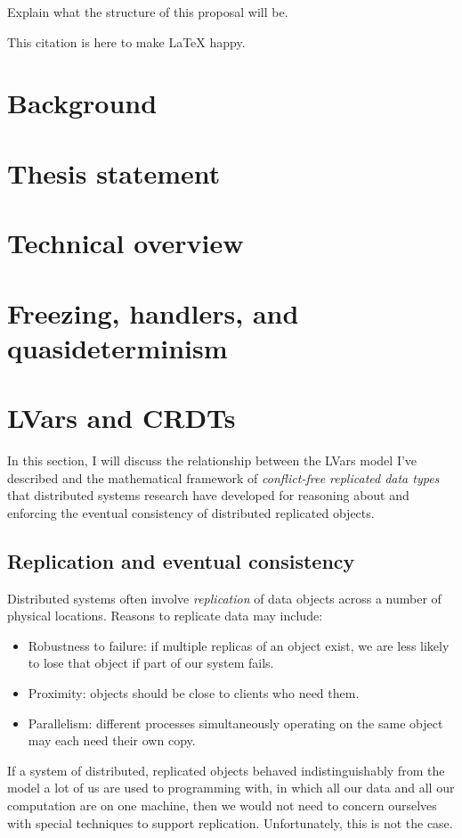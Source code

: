 \documentclass{article}
\begin{document}
Explain what the structure of this proposal will be.

This citation \cite{LVars-TR} is here to make LaTeX happy.

\section{Background}

\section{Thesis statement}

\section{Technical overview}

\section{Freezing, handlers, and quasideterminism}

\section{LVars and CRDTs}

In this section, I will discuss the relationship between the LVars
model I've described and the mathematical framework of
\emph{conflict-free replicated data types} that distributed systems
research have developed for reasoning about and enforcing the eventual
consistency of distributed replicated objects.

\subsection{Replication and eventual consistency}

Distributed systems often involve \emph{replication} of data objects
across a number of physical locations.  Reasons to replicate data may
include:
\begin{itemize}
\item Robustness to failure: if multiple replicas of an object exist,
  we are less likely to lose that object if part of our system fails.

\item Proximity: objects should be close to clients who need them.

\item Parallelism: different processes simultaneously operating on the
  same object may each need their own copy. 
\end{itemize}
If a system of distributed, replicated objects behaved
indistinguishably from the model a lot of us are used to programming
with, in which all our data and all our computation are on one
machine, then we would not need to concern ourselves with special
techniques to support replication.    Unfortunately, this is
not the case.
\end{document}
